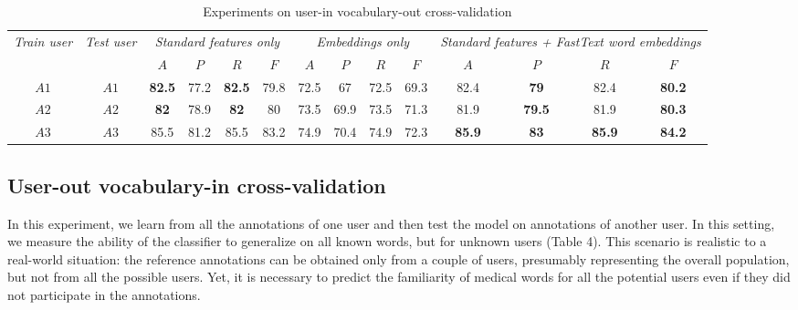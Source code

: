 \begin{table}[h]
\label{tab:user-in-voc-out}
\begin{tabular}{cc|cccc|cccc|cccc}
\multirow{2}{1cm}{\textit{Train user}} & \multirow{2}{1cm}{\textit{Test user}} & \multicolumn{4}{c|}{\textit{Standard features only}} & \multicolumn{4}{c|}{\textit{Embeddings only}} & \multicolumn{4}{X}{\textit{Standard features + FastText word embeddings}} \\ \cline{3-14} 
 &  & $A$ & $P$ & $R$ & $F$ & $A$ & $P$ & $R$ & $F$ & $A$ & $P$ & $R$ & $F$ \\ \hline
$A1$ & $A1$ & \textbf{82.5} & 77.2 & \textbf{82.5} & 79.8 & 72.5 & 67 & 72.5 & 69.3 & 82.4 & \textbf{79} & 82.4 & \textbf{80.2} \\
$A2$ & $A2$ & \textbf{82} & 78.9 & \textbf{82} & 80 & 73.5 & 69.9 & 73.5 & 71.3 & 81.9 & \textbf{79.5} & 81.9 & \textbf{80.3} \\ 
$A3$ & $A3$ & 85.5 & 81.2 & 85.5 & 83.2 & 74.9 & 70.4 & 74.9 & 72.3 & \textbf{85.9} & \textbf{83} & \textbf{85.9} & \textbf{84.2} \\ \hline 
\end{tabular}
\caption{Experiments on user-in vocabulary-out cross-validation}
\end{table}


\subsection{User-out vocabulary-in cross-validation}

In this experiment, we learn from all the annotations of one user and then test the model on annotations of another user. In this setting, we measure the ability of the classifier to generalize on all known words, but for unknown users (Table 4). This scenario is realistic to a real-world situation: the reference annotations can be obtained only from a couple of users, presumably representing the overall population, but not from all the possible users. Yet, it is necessary to predict the familiarity of medical words for all the potential users even if they
did not participate in the annotations.


